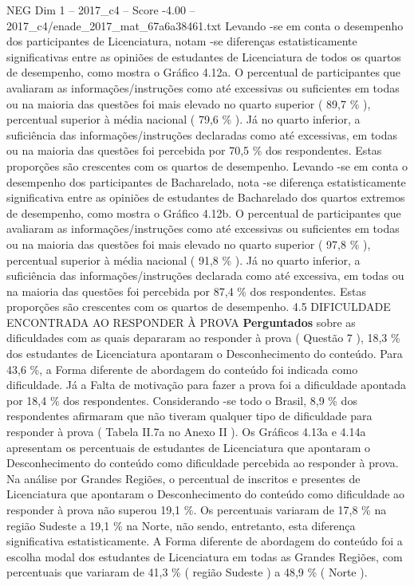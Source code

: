 \begin{textsample}{NEG Dim 1 – 2017\_c4 – Score -4.00 – 2017\_c4/enade\_2017\_mat\_67a6a38461.txt}
Levando -se em conta o desempenho dos participantes de Licenciatura, notam -se diferenças estatisticamente significativas entre as opiniões de estudantes de Licenciatura de todos os quartos de desempenho, como mostra o Gráfico 4.12a.
O percentual de participantes que avaliaram as informações/instruções como até excessivas ou suficientes em todas ou na maioria das questões foi mais elevado no quarto superior ( 89,7 \% ), percentual superior à média nacional ( 79,6 \% ).
Já no quarto inferior, a suficiência das informações/instruções declaradas como até excessivas, em todas ou na maioria das questões foi percebida por 70,5 \% dos respondentes.
Estas proporções são crescentes com os quartos de desempenho.
Levando -se em conta o desempenho dos participantes de Bacharelado, nota -se diferença estatisticamente significativa entre as opiniões de estudantes de Bacharelado dos quartos extremos de desempenho, como mostra o Gráfico 4.12b.
O percentual de participantes que avaliaram as informações/instruções como até excessivas ou suficientes em todas ou na maioria das questões foi mais elevado no quarto superior ( 97,8 \% ), percentual superior à média nacional ( 91,8 \% ).
Já no quarto inferior, a suficiência das informações/instruções declarada como até excessiva, em todas ou na maioria das questões foi percebida por 87,4 \% dos respondentes.
Estas proporções são crescentes com os quartos de desempenho. 4.5 DIFICULDADE ENCONTRADA AO RESPONDER À PROVA \textbf{Perguntados} sobre as dificuldades com as quais depararam ao responder à prova ( Questão 7 ), 18,3 \% dos estudantes de Licenciatura apontaram o Desconhecimento do conteúdo.
Para 43,6 \%, a Forma diferente de abordagem do conteúdo foi indicada como dificuldade.
Já a Falta de motivação para fazer a prova foi a dificuldade apontada por 18,4 \% dos respondentes.
Considerando -se todo o Brasil, 8,9 \% dos respondentes afirmaram que não tiveram qualquer tipo de dificuldade para responder à prova ( Tabela II.7a no Anexo II ).
Os Gráficos 4.13a e 4.14a apresentam os percentuais de estudantes de Licenciatura que apontaram o Desconhecimento do conteúdo como dificuldade percebida ao responder à prova.
Na análise por Grandes Regiões, o percentual de inscritos e presentes de Licenciatura que apontaram o Desconhecimento do conteúdo como dificuldade ao responder à prova não superou 19,1 \%.
Os percentuais variaram de 17,8 \% na região Sudeste a 19,1 \% na Norte, não sendo, entretanto, esta diferença significativa estatisticamente.
A Forma diferente de abordagem do conteúdo foi a escolha modal dos estudantes de Licenciatura em todas as Grandes Regiões, com percentuais que variaram de 41,3 \% ( região Sudeste ) a 48,9 \% ( Norte ).

\end{textsample}

